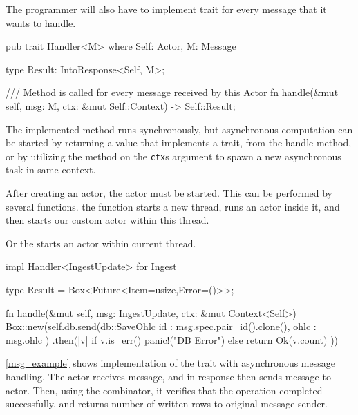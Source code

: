 The programmer will also have to implement  trait for every message that it wants to handle.

\begin{code}[language=rust,label={handler_trait},caption={Handler trait}]
    pub trait Handler<M> where Self: Actor, M: Message
    {
        type Result: IntoResponse<Self, M>;

        /// Method is called for every message received by this Actor
        fn handle(&mut self, msg: M, ctx: &mut Self::Context) -> Self::Result;

    }
\end{code}

The implemented  method runs synchronously, but asynchronous computation
can be started by returning a value that implements a   trait, from the handle method, or by utilizing the 
method on the \verb|ctx|s argument to spawn a new asynchronous task in same context.

After creating an actor, the actor must be started. This can be performed by several functions.
the  function starts a new thread, runs an  actor inside it, and then
starts our custom actor within this thread.

Or the  starts an actor within current thread.

\begin{code}[language=rust,label={msg_example},caption={Asynchronous message handling example}]
    impl Handler<IngestUpdate> for Ingest {
        type Result = Box<Future<Item=usize,Error=()>>;

        fn handle(&mut self, msg: IngestUpdate, ctx: &mut Context<Self>) {
            Box::new(self.db.send(db::SaveOhlc{
                id : msg.spec.pair_id().clone(),
                ohlc : msg.ohlc
            })
            .then(|v| if v.is_err() { panic!("DB Error")} else { return Ok(v.count) }))
        }
    }
\end{code}

\autoref{msg_example} shows implementation of the  trait with asynchronous message handling. The  actor receives  message,
and in response then sends  message to  actor. Then, using the  combinator, it
verifies that the operation completed successfully, and returns number of written rows to original message sender.

